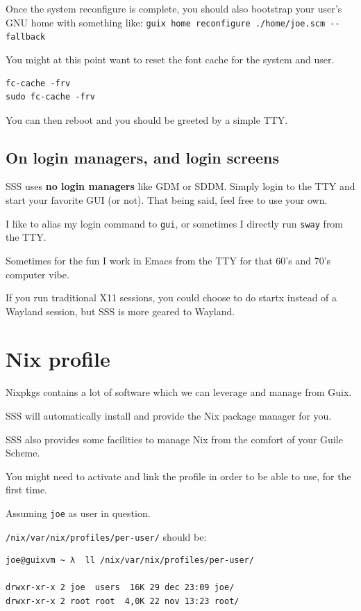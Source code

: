 \documentclass[11pt]{article}
\begin{document}
Once the system reconfigure is complete, you should also bootstrap your user's GNU home with something like: \texttt{guix home reconfigure ./home/joe.scm  -{}-{}fallback}

You might at this point want to reset the font cache for the system and user.

\begin{verbatim}
fc-cache -frv
sudo fc-cache -frv
\end{verbatim}

You can then reboot and you should be greeted by a simple TTY.

\subsection{On login managers, and login screens}
\label{sec:orgd2b3ffd}

SSS uses \textbf{no login managers} like GDM or SDDM. Simply login to the TTY and start your favorite GUI (or not).
That being said, feel free to use your own.

I like to alias my login command to \texttt{gui}, or sometimes I directly run \texttt{sway} from the TTY.

Sometimes for the fun I work in Emacs from the TTY for that 60's and 70's computer vibe.

If you run traditional X11 sessions, you could choose to do startx instead of a Wayland session, but SSS is more geared to Wayland.


\section{Nix profile}
\label{sec:orgbfd5118}

Nixpkgs contains a lot of software which we can leverage and manage from Guix.

SSS will automatically install and provide the Nix package manager for you.

SSS also provides some facilities to manage Nix from the comfort of your Guile Scheme.

You might need to activate and link the profile in order to be able to use, for the first time.

Assuming \texttt{joe} as user in question.

\texttt{/nix/var/nix/profiles/per-user/} should be:
\begin{verbatim}
joe@guixvm ~ λ  ll /nix/var/nix/profiles/per-user/

drwxr-xr-x 2 joe  users  16K 29 dec 23:09 joe/
drwxr-xr-x 2 root root  4,0K 22 nov 13:23 root/
\end{verbatim}
\end{document}
